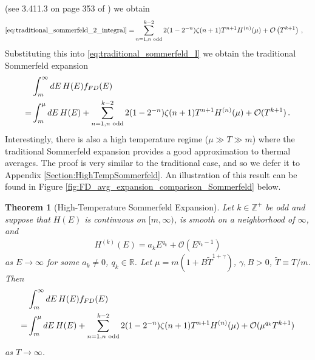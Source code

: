 \documentclass[sn-mathphys,Numbered]{sn-jnl}
\newtheorem{theorem}{Theorem}
\begin{document}
(see 3.411.3 on page 353 of  \cite{Gradshteyn:1943cpj}) we obtain 
\begin{align}
   \eqref{eq:traditional_sommerfeld_2_integral}     
   =&\sum_{n=1,n\text{ odd}}^{k-2} 2(1-2^{-n})\zeta(n+1)T^{n+1} H^{(n)}(\mu) +\mathcal{O}\left(T^{k+1}\right)\,,
\end{align}
Substituting this into \eqref{eq:traditional_sommerfeld_I} we obtain the traditional Sommerfeld expansion
\begin{align}
 &\int_m^\infty dE\, H(E) f_{FD}(E)\notag\\
  = &\int_m^\mu dE\, H(E)+\sum_{n=1,n\text{ odd}}^{k-2} 2(1-2^{-n})\zeta(n+1)T^{n+1} H^{(n)}(\mu) +\mathcal{O}(T^{k+1})\,.\label{eq:traditional_Sommerfeld_final}
   \end{align}
Interestingly, there is also a high temperature regime ($\mu\gg T\gg m$) where the traditional Sommerfeld expansion provides a good approximation to thermal averages.  The proof is very similar to the traditional case, and so we defer it to Appendix  \ref{Section:HighTempSommerfeld}. An illustration of this result can be found in Figure \ref{fig:FD_avg_expansion_comparison_Sommerfeld} below.
\begin{theorem}[High-Temperature Sommerfeld Expansion]\label{thm:high_T_Sommerfeld_main}
Let $k\in\mathbb{Z}^+$ be odd and suppose that $H(E)$ is continuous on $[m,\infty)$, is smooth on a neighborhood of $\infty$, and
\begin{align}
  H^{(k)}(E)=a_kE^{q_k}+\mathcal{O}(E^{q_k-1})  
\end{align}
as $E\to \infty$ for some $a_k\neq 0$, $q_k\in\mathbb{R}$.  Let $\mu=m(1+B\widetilde{T}^{1+\gamma})$, $\gamma,B>0$, $\widetilde{T}\equiv T/m$. Then
\begin{align}
    &\int_m^\infty dE\, H(E)f_{FD}(E)\notag\\
=&\int_m^\mu dE\, H(E)+\sum_{n=1,n\text{ odd}}^{k-2} 2(1-2^{-n})\zeta(n+1)T^{n+1}H^{(n)}(\mu)+\mathcal{O}(\mu^{q_k}T^{k+1})\label{eq:Sommerfeld_high_temp_final_main}
\end{align}
as $T\to\infty$.
\end{theorem}
\end{document}
